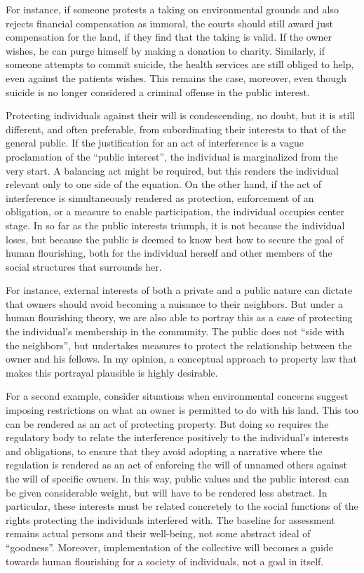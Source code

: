 For instance, if someone protests a taking on environmental grounds and also rejects financial compensation as immoral, the courts should still award just compensation for the land, if they find that the taking is valid. If the owner wishes, he can purge himself by making a donation to charity. Similarly, if someone attempts to commit suicide, the health services are still obliged to help, even against the patients wishes. This remains the case, moreover, even though suicide is no longer considered a criminal offense in the public interest. 

Protecting individuals against their will is condescending, no doubt, but it is still different, and often preferable, from subordinating their interests to that of the general public. If the justification for an act of interference is a vague proclamation of the ``public interest'', the individual is marginalized from the very start. A balancing act might be required, but this renders the individual relevant only to one side of the equation. On the other hand, if the act of interference is simultaneously rendered as protection, enforcement of an obligation, or a measure to enable participation, the individual occupies center stage. In so far as the public interests triumph, it is not because the individual loses, but because the public is deemed to know best how to secure the goal of human flourishing, both for the individual herself and other members of the social structures that surrounds her.

For instance, external interests of both a private and a public nature can dictate that owners should avoid becoming a nuisance to their neighbors. But under a human flourishing theory, we are also able to portray this as a case of protecting the individual's membership in the community. The public does not ``side with the neighbors'', but undertakes measures to protect the relationship between the owner and his fellows. In my opinion, a conceptual approach to property law that makes this portrayal plausible is highly desirable. 

For a second example, consider situations when environmental concerns suggest imposing restrictions on what an owner is permitted to do with his land. This too can be rendered as an act of protecting property. But doing so requires the regulatory body to relate the interference positively to the individual's interests and obligations, to ensure that they avoid adopting a narrative where the regulation is rendered as an act of enforcing the will of unnamed others against the will of specific owners. In this way, public values and the public interest can be given considerable weight, but will have to be rendered less abstract. In particular, these interests must be related concretely to the social functions of the rights protecting the individuals interfered with. The baseline for assessment remains actual persons and their well-being, not some abstract ideal of ``goodness''. Moreover, implementation of the collective will becomes a guide towards human flourishing for a society of individuals, not a goal in itself.

